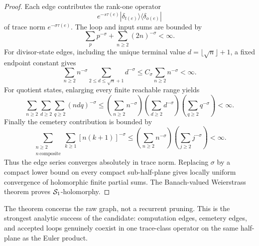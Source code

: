 \begin{proof}
Each edge contributes the rank-one operator
\[
e^{-s\tau(e)}|\delta_{t(e)}\rangle\langle\delta_{o(e)}|
\]
of trace norm $e^{-\sigma\tau(e)}$.  The loop and input sums are bounded by
\[
\sum_p p^{-\sigma}+\sum_{n\ge2}(2n)^{-\sigma}<\infty.
\]
For divisor-state edges, including the unique terminal value
$d=\lfloor\sqrt n\rfloor+1$, a fixed endpoint constant gives
\[
\sum_{n\ge2}n^{-\sigma}
 \sum_{2\le d\le\sqrt n+1}d^{-\sigma}
\le C_\sigma\sum_{n\ge2}n^{-\sigma}<\infty.
\]
For quotient states, enlarging every finite reachable range yields
\[
\sum_{n\ge2}\sum_{d\ge2}\sum_{q\ge2}(ndq)^{-\sigma}
\le
\left(\sum_{n\ge2}n^{-\sigma}\right)
\left(\sum_{d\ge2}d^{-\sigma}\right)
\left(\sum_{q\ge2}q^{-\sigma}\right)<\infty.
\]
Finally the cemetery contribution is bounded by
\[
\sum_{\substack{n\ge2\\ n\,\mathrm{composite}}}
\sum_{k\ge1}[n(k+1)]^{-\sigma}
\le
\left(\sum_{n\ge2}n^{-\sigma}\right)
\left(\sum_{j\ge2}j^{-\sigma}\right)<\infty.
\]
Thus the edge series converges absolutely in trace norm.  Replacing
$\sigma$ by a compact lower bound on every compact sub-half-plane gives
locally uniform convergence of holomorphic finite partial sums.  The
Banach-valued Weierstrass theorem proves $\mathcal S_1$-holomorphy.
\end{proof}

The theorem concerns the raw graph, not a recurrent pruning.  This is the
strongest analytic success of the candidate: computation edges, cemetery
edges, and accepted loops genuinely coexist in one trace-class operator on
the same half-plane as the Euler product.
